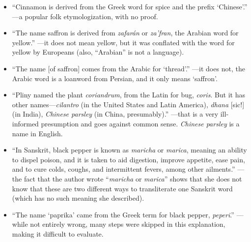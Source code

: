 \begin{itemize}
    \item ``Cinnamon is derived from the Greek word for spice and the prefix `Chinese'.'' \parencite[10]{czarra_spices_2009}---a popular folk etymologization, with no proof. 
    \item ``The name saffron is derived from \textit{zafarán} or \textit{za'fran}, the Arabian word for yellow.'' \parencite[124]{van_wyk_culinary_2014}---it does not mean yellow, but it was conflated with the word for yellow by Europeans (also, ``Arabian'' is not a language).
    \item ``The name [of saffron] comes from the Arabic for `thread'.'' \parencite[422]{mcgee_food_2004}---it does not, the Arabic word is a loanword from Persian, and it only means `saffron'. 
    \item ``Pliny named the plant \textit{coriandrum}, from the Latin for bug, \textit{coris}. But it has other names---\textit{cilantro} (in the United States and Latin America), \textit{dhana} [sic!] (in India), \textit{Chinese parsley} (in China, presumably).'' \parencite[87]{oconnell_book_2016}---that is a very ill-informed presumption and goes against common sense. \textit{Chinese parsley} is a name in English.
    \item ``In Sanskrit, black pepper is known as \textit{maricha} or \textit{marica}, meaning an ability to dispel poison, and it is taken to aid digestion, improve appetite, ease pain, and to cure colds, coughs, and intermittent fevers, among other ailments.'' \parencite[3]{shaffer_pepper_2013}---the fact that the author wrote ``\textit{maricha} or \textit{marica}'' shows that she does not know that these are two different ways to transliterate one Sanskrit word (which has no such meaning she described).
    \item ``The name `paprika' came from the Greek term for black pepper, \textit{peperi}.'' 
    \parencite[103]{czarra_spices_2009}---while not entirely wrong, many steps were skipped in this explanation, making it difficult to evaluate.
\end{itemize}



